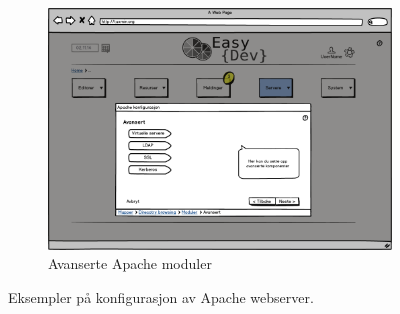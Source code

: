 \begin{figure}[p]
        \vspace{0.6cm}
        \begin{subfigure}[b]{0.48\textwidth}
                \includegraphics[width=\textwidth]
                {./img/prosessdokumentasjon/lowfi/apache5.png}
                \caption{Avanserte Apache moduler}
                \label{fig:apache5}
        \end{subfigure}
        \vspace{0.1cm}
        \caption[Konfigurasjon av Apache webserver]{Eksempler på konfigurasjon av Apache webserver.}\label{fig:lowfiapache}
\end{figure}

\pagebreak

